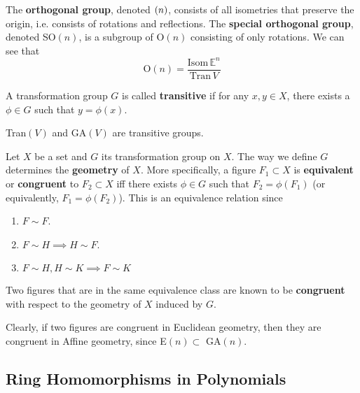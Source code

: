 \documentclass{article}
\let\O\relax
\DeclareMathOperator{\O}{O}
\begin{document}
  \begin{definition}
    The \textbf{orthogonal group}, denoted $\O(n)$, consists of all isometries that preserve the origin, i.e. consists of rotations and reflections. The \textbf{special orthogonal group}, denoted SO$(n)$, is a subgroup of O$(n)$ consisting of only rotations. We can see that 
    \begin{equation}
      \text{O}(n)=\frac{\text{Isom}\, \mathbb{E}^{n}}{\text{Tran}\,V}
    \end{equation}
  \end{definition}

  \begin{definition}[Transitive]
    A transformation group $G$ is called \textbf{transitive} if for any $x, y \in X$, there exists a $\phi \in G$ such that $y = \phi(x)$. 
  \end{definition}

  \begin{example}
    Tran$(V)$ and GA$(V)$ are transitive groups. 
  \end{example}

  \begin{definition}
    Let $X$ be a set and $G$ its transformation group on $X$. The way we define $G$ determines the \textbf{geometry} of $X$. More specifically, a figure $F_{1} \subset X$ is \textbf{equivalent} or \textbf{congruent} to $F_{2} \subset X$ iff there exists $\phi \in G$ such that $F_{2} = \phi (F_{1})$ (or equivalently, $F_{1} = \phi (F_{2})$). This is an equivalence relation since
    \begin{enumerate}
      \item $F \sim F$. 
      \item $F \sim H \implies H \sim F$. 
      \item $F \sim H, H \sim K \implies F \sim K$
    \end{enumerate}
    Two figures that are in the same equivalence class are known to be \textbf{congruent} with respect to the geometry of $X$ induced by $G$. 
  \end{definition}

  Clearly, if two figures are congruent in Euclidean geometry, then they are congruent in Affine geometry, since E$(n) \subset$ GA$(n)$. 

\subsection{Ring Homomorphisms in Polynomials} 
  
\end{document}
